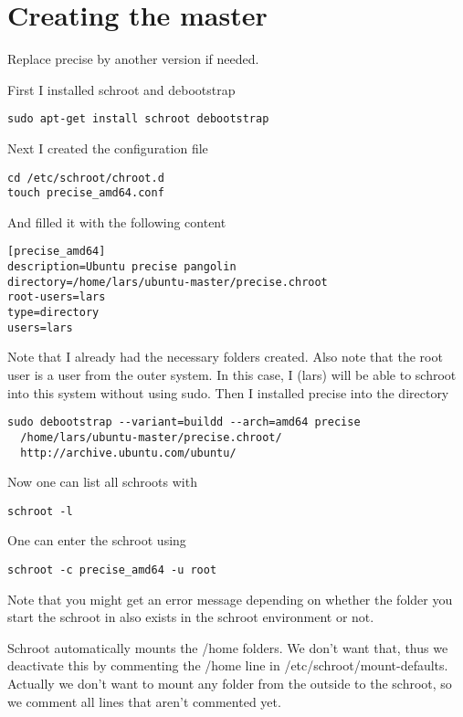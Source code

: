 \documentclass[a4paper]{article}
\begin{document}
\section{Creating the master}
Replace precise by another version if needed.

First I installed schroot and debootstrap

\begin{verbatim}
sudo apt-get install schroot debootstrap
\end{verbatim}

Next I created the configuration file

\begin{verbatim}
cd /etc/schroot/chroot.d
touch precise_amd64.conf
\end{verbatim}

And filled it with the following content

\begin{verbatim}
[precise_amd64]
description=Ubuntu precise pangolin
directory=/home/lars/ubuntu-master/precise.chroot
root-users=lars
type=directory
users=lars
\end{verbatim}

Note that I already had the necessary folders created.
Also note that the root user is a user from the outer system. In this case, I (lars) will be able to schroot into this system without using sudo.
Then I installed precise into the directory

\begin{verbatim}
sudo debootstrap --variant=buildd --arch=amd64 precise 
  /home/lars/ubuntu-master/precise.chroot/ 
  http://archive.ubuntu.com/ubuntu/
\end{verbatim}

Now one can list all schroots with

\begin{verbatim}
schroot -l
\end{verbatim}

One can enter the schroot using

\begin{verbatim}
schroot -c precise_amd64 -u root
\end{verbatim}

Note that you might get an error message depending on whether the folder you start the schroot in also exists in the schroot environment or not.

Schroot automatically mounts the /home folders. We don't want that, thus we deactivate this by commenting the /home line in /etc/schroot/mount-defaults. Actually we don't want to mount any folder from the outside to the schroot, so we comment all lines that aren't commented yet.
\end{document}
